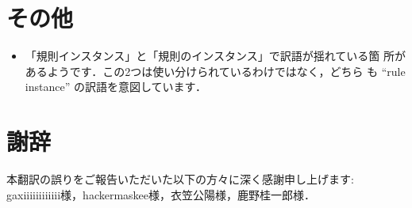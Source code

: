 \documentclass[12pt,titlepage,twoside,openright,dvipdfmx]{jsbook}
\theoremstyle{definition}
\begin{document}
\section*{その他}

\ifnum{}
\begin{itemize}
\item 「規則インスタンス」と「規則のインスタンス」で訳語が揺れている箇
  所があるようです．この2つは使い分けられているわけではなく，どちら
  も ``rule instance'' の訳語を意図しています．
\end{itemize}
\fi

\section*{謝辞}

本翻訳の誤りをご報告いただいた以下の方々に深く感謝申し上げます: gaxiiiiiiiiiiii様，hackermaskee様，衣笠公陽様，鹿野桂一郎様．
\end{document}
